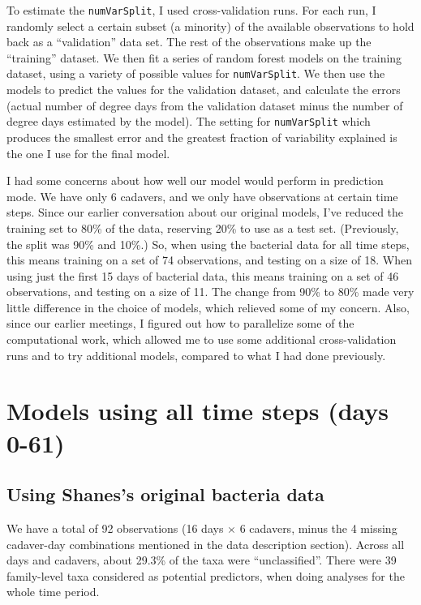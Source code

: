 \documentclass{article}
\begin{document}
To estimate the \texttt{numVarSplit}, I used cross-validation
runs.  For each run, I randomly select a certain subset (a minority)
of the available observations to hold back as a ``validation'' data
set.  The rest of the observations make up the ``training'' dataset.
We then fit a series of random forest models on the training dataset,
using a variety of possible values for \texttt{numVarSplit}.  We then
use the models to predict the values for the validation dataset, and
calculate the errors (actual number of degree days from the validation
dataset minus the number of degree days estimated by the model).  The
setting for \texttt{numVarSplit} which produces the smallest error and
the greatest fraction of variability explained is the one I use for the
final model.

I had some concerns about how well our model would perform in
prediction mode.  We have only 6 cadavers, and we only have
observations at certain time steps.  Since our earlier conversation
about our original models, I've reduced the training set to 80\% of
the data, reserving 20\% to use as a test set.  (Previously, the split
was 90\% and 10\%.)  So, when using the bacterial data for all time
steps, this means training on a set of 74 observations, and testing on
a size of 18.  When using just the first 15 days of bacterial data,
this means training on a set of 46 observations, and testing on a size
of 11.  The change from 90\% to 80\% made very little difference in
the choice of models, which relieved some of my concern.  Also, since our
earlier meetings, I figured out how to parallelize some of the
computational work, which allowed me to use some additional
cross-validation runs and to try additional models, compared to what I
had done previously.


\section{Models using all time steps (days 0-61)}


\subsection{Using Shanes's original bacteria data}

We have a total of 92 observations (16 days $\times$ 6 cadavers, minus
the 4 missing cadaver-day combinations mentioned in the data
description section).  Across all days and cadavers, about 29.3\% of
the taxa were ``unclassified''.  There were 39 family-level taxa
considered as potential predictors, when doing analyses for the whole
time period.
\end{document}
